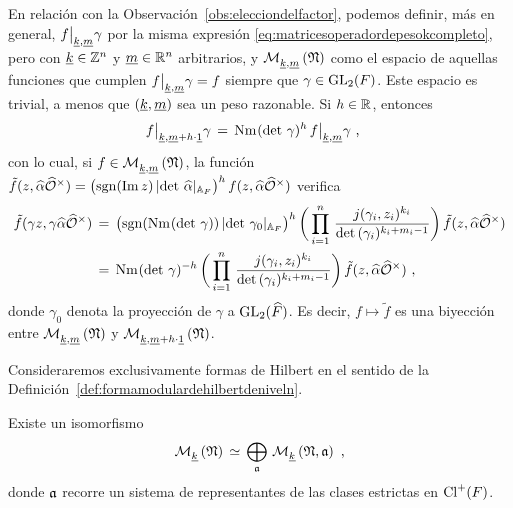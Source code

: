 \begin{obsEleccionDelFactorParaAdelicas}%
	\label{obs:elecciondelfactorparaadelicas}
	En relaci\'{o}n con la Observaci\'{o}n~\ref{obs:elecciondelfactor},
	podemos definir, m\'{a}s en general,
	$f\operadormatrices{\peso{k},\peso{m}}{\gamma}$ por la misma
	expresi\'{o}n \eqref{eq:matricesoperadordepesokcompleto}, pero con
	$\peso{k}\in\bb{Z}^{n}$ y $\peso{m}\in\bb{R}^{n}$ arbitrarios, y
	$\modular{\peso{k},\peso{m}}{\frak{N}}$ como el espacio de aquellas
	funciones que cumplen $f\operadormatrices{\peso{k},\peso{m}}{\gamma}=f$
	siempre que $\gamma\in\GL_{2}(F)$. Este espacio es trivial, a menos que
	$(\peso{k},\peso{m})$ sea un peso razonable. Si $h\in\bb{R}$, entonces
	\begin{align*}
		f\operadormatrices{\peso{k},\peso{m}+h\cdot\peso{1}}{\gamma} &
			\,=\,\norma(\det\,\gamma)^{h}\,
			f\operadormatrices{\peso{k},\peso{m}}{\gamma}
		\text{ ,}
	\end{align*}
	con lo cual, si $f\in\modular{\peso{k},\peso{m}}{\frak{N}}$, la
	funci\'{o}n
	\begin{math}
		\tilde{f}(z,\hhat{\alpha}\Idfin{\cal{O}})=
			\big(\signo(\Im\,z)\,
			|\det\,\hhat{\alpha}|_{\adeles{F}}\big)^{h}\,
			f(z,\hhat{\alpha}\Idfin{\cal{O}})
	\end{math} verifica
	\begin{align*}
		\tilde{f}(\gamma z,\gamma\hhat{\alpha}\Idfin{\cal{O}}) & \,=\,
			\big(\signo(\norma(\det\,\gamma))\,
				|\det\,\gamma_{0}|_{\adeles{F}}\big)^{h}\,
			\bigg(\prod_{i=1}^{n}\,
				\frac{j(\gamma_{i},z_{i})^{k_{i}}}{%
					\det(\gamma_{i})^{k_{i}+m_{i}-1}}
				\bigg)\,
				\tilde{f}(z,\hhat{\alpha}\Idfin{\cal{O}}) \\
		& \,=\,\norma(\det\,\gamma)^{-h}\,\bigg(\prod_{i=1}^{n}\,
				\frac{j(\gamma_{i},z_{i})^{k_{i}}}{%
					\det(\gamma_{i})^{k_{i}+m_{i}-1}}
				\bigg)\,
				\tilde{f}(z,\hhat{\alpha}\Idfin{\cal{O}})
		\text{ ,}
	\end{align*}
	donde $\gamma_{0}$ denota la proyecci\'{o}n de $\gamma$ a
	$\GL_{2}(\Adfin{F})$. Es decir, $f\mapsto\tilde{f}$ es una
	biyecci\'{o}n entre $\modular{\peso{k},\peso{m}}{\frak{N}}$ y
	$\modular{\peso{k},\peso{m}+h\cdot\peso{1}}{\frak{N}}$.
\end{obsEleccionDelFactorParaAdelicas}

Consideraremos exclusivamente formas de Hilbert en el sentido de la
Definici\'{o}n~\ref{def:formamodulardehilbertdeniveln}.

\begin{propoDescomposicionDelEspacioDeFormasModularesDeHilbert}%
	\label{thm:descomposiciondelespaciodeformasmodularesdehilbert}
	Existe un isomorfismo
	\begin{equation}
		\label{eq:descomposicionmodularesmatrices}
		\modularH{k}{\frak{N}} \,\simeq\, \bigoplus_{\frak{a}}\,
			\modularH{k}{\frak{N},\frak{a}}
		\text{ ,}
	\end{equation}
	donde $\frak{a}$ recorre un sistema de representantes de las clases
	estrictas en $\pClass{F}$.
\end{propoDescomposicionDelEspacioDeFormasModularesDeHilbert}

